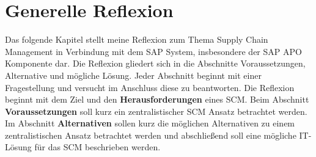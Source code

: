 \chapter{Generelle Reflexion}
Das folgende Kapitel stellt meine Reflexion zum Thema Supply Chain Management in Verbindung mit dem SAP System, insbesondere der SAP \ac{APO} Komponente dar. Die Reflexion gliedert sich in die Abschnitte Voraussetzungen, Alternative und mögliche Lösung. Jeder Abschnitt beginnt mit einer Fragestellung und versucht im Anschluss diese zu beantworten.
Die Reflexion beginnt mit dem Ziel und den \textbf{Herausforderungen} eines \ac{SCM}. Beim Abschnitt \textbf{Voraussetzungen} soll kurz ein zentralistischer \ac{SCM} Ansatz betrachtet werden. Im Abschnitt \textbf{Alternativen} sollen kurz die möglichen Alternativen zu einem zentralistischen Ansatz betrachtet werden und abschließend soll eine mögliche IT-Lösung für das \ac{SCM} beschrieben werden.


